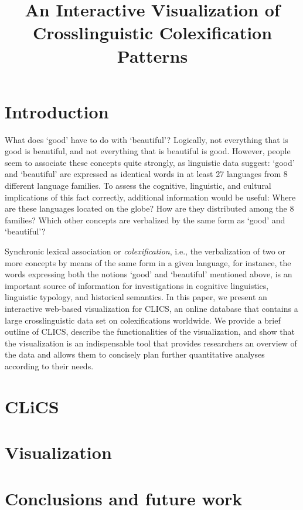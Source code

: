 \documentclass[10pt, a4paper]{article}
\title{An Interactive Visualization of Crosslinguistic Colexification Patterns}
\begin{document}
\maketitleabstract

\section{Introduction}

What does `good' have to do with `beautiful'? Logically, not everything that is good is beautiful, and not everything that is beautiful is good. However, people seem to associate these concepts quite strongly, as linguistic data suggest: `good' and `beautiful' are expressed as identical words in at least 27 languages from 8 different language families. To assess the cognitive, linguistic, and cultural implications of this fact correctly, additional information would be useful: Where are these languages located on the globe? How are they distributed among the 8 families? Which other concepts are verbalized by the same form as `good' and `beautiful'?

Synchronic lexical association or \textsl{colexification}, i.e., the verbalization of two or more concepts by means of the same form in a given language, for instance, the words expressing both the notions `good' and `beautiful' mentioned above, is an important source of information for investigations in cognitive linguistics, linguistic typology, and historical semantics. In this paper, we present an interactive web-based visualization for CLICS, an online database that contains a large crosslinguistic data set on colexifications worldwide. We provide a brief outline of CLICS, describe the functionalities of the visualization, and show that the visualization is an indispensable tool that provides researchers an overview of the data and allows them to concisely plan further quantitative analyses according to their needs.

\section{CLiCS}



\section{Visualization}



\section{Conclusions and future work}
\end{document}
